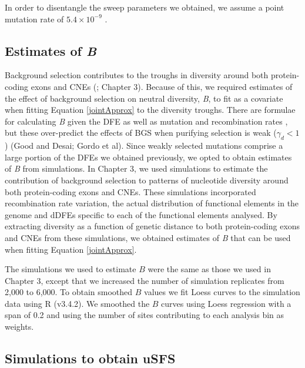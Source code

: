 \documentclass[11pt]{article}
\begin{document}
	In order to disentangle the sweep parameters we obtained, we assume a point mutation rate of $5.4 \times 10^{-9}$ \citep{RN228}.	
	
	\subsection*{Estimates of \textit{B}} 
 
 	Background selection contributes to the troughs in diversity around both protein-coding exons and CNEs (\citealt{RN122}; Chapter 3). Because of this, we required estimates of the effect of background selection on neutral diversity, \textit{B}, to fit as a covariate when fitting Equation \ref{jointApprox} to the diversity troughs. There are formulae for calculating \textit{B} given the DFE as well as mutation and recombination rates \citep{RN157, RN206}, but these over-predict the effects of BGS when purifying selection is weak ($\gamma_d < 1$) (Good and Desai; Gordo et al). Since weakly selected mutations comprise a large portion of the DFEs we obtained previously, we opted to obtain estimates of \textit{B} from simulations. In Chapter 3, we used simulations to estimate the contribution of background selection to patterns of nucleotide diversity around both protein-coding exons and CNEs. These simulations incorporated recombination rate variation, the actual distribution of functional elements in the genome and dDFEs specific to each of the functional elements analysed. By extracting diversity as a function of genetic distance to both protein-coding exons and CNEs from these simulations, we obtained estimates of \textit{B} that can be used when fitting Equation \ref{jointApprox}.
 	
 	The simulations we used to estimate $B$ were the same as those we used in Chapter 3, except that we increased the number of simulation replicates from 2,000 to 6,000. To obtain smoothed $B$ values we fit Loess curves to the simulation data using R (v3.4.2). We smoothed the $B$ curves using Loess regression with a span of 0.2 and using the number of sites contributing to each analysis bin as weights.

	\subsection*{Simulations to obtain uSFS}
	
\end{document}
